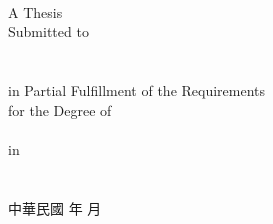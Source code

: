\begin{center}
\fi
%
\renewcommand{\baselinestretch}{\mybaselinestretch}   %
\normalsize %
\large
%
\vfill
\makebox[4cm][s]{\univCname}\\%
\makebox[6cm][s]{\deptCname}\\%
\\%
%
\vfill
\large
A Thesis\\%
Submitted to %
%
\fulldeptEname\\%
%
%
\ifx \collEname  \itsempty
\relax %
\else
\collEname\\%
\fi
%
\univEname\\%
%
in Partial Fulfillment of the Requirements\\
%
for the Degree of\\
%
\degreeEname\\%
%
in\\
%
\deptEname\\%
%
\eMonth\ \eYear\\%
%
\ePlace%
\vfill
中華民國%
\cYear%
年%
\cMonth%
月\\
\end{center}
\normalsize
\clearpage
%
\newpage%
{\thispagestyle{empty}%
%
\mbox{}\clearpage}

%
\newpage%
{\thispagestyle{empty}%
%
\mbox{}\clearpage}

%
\newpage
\thispagestyle{plain}  %

